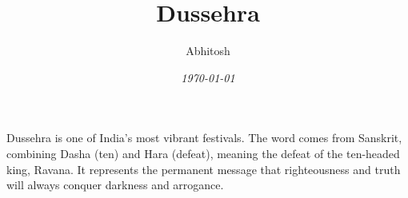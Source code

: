 \documentclass[12pt, a4paper]{article}
\title{\Huge \textbf{Dussehra}}
\author{\Large Abhitosh}
\date{\textit{\today}}
\begin{document}
\maketitle
\vspace{1cm}

\begin{center}
\Large
{} %
Dussehra is one of India's most vibrant festivals. The word comes from Sanskrit, combining Dasha (ten) and Hara (defeat), meaning the defeat of the ten-headed king, Ravana. It represents the permanent message that righteousness and truth will always conquer darkness and arrogance.
\end{center}
\end{document}
